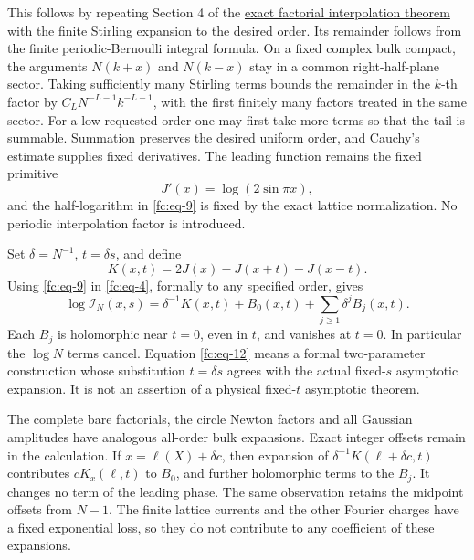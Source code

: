This follows by repeating Section 4 of the \href{https://sashakolpakov.github.io/murakamis_dream/notes/exact_factorial_interpolation_and_complex_contours.html}{exact factorial interpolation theorem} with the finite Stirling expansion to the desired order. Its remainder follows from the finite periodic-Bernoulli integral formula. On a fixed complex bulk compact, the arguments \(N(k+x)\) and \(N(k-x)\) stay in a common right-half-plane sector. Taking sufficiently many Stirling terms bounds the remainder in the \(k\)-th factor by \(C_LN^{-L-1}k^{-L-1}\), with the first finitely many factors treated in the same sector. For a low requested order one may first take more terms so that the tail is summable. Summation preserves the desired uniform order, and Cauchy's estimate supplies fixed derivatives. The leading function remains the fixed primitive
\begin{equation}\label{fc:eq-10}
J'(x)=\log(2\sin\pi x),
\end{equation}
 and the half-logarithm in \eqref{fc:eq-9} is fixed by the exact lattice normalization. No periodic interpolation factor is introduced.

Set \(\delta=N^{-1}\), \(t=\delta s\), and define
\begin{equation}\label{fc:eq-11}
K(x,t)=2J(x)-J(x+t)-J(x-t).
\end{equation}
 Using \eqref{fc:eq-9} in \eqref{fc:eq-4}, formally to any specified order, gives
\begin{equation}\label{fc:eq-12}
\log\mathcal I_N(x,s)=
  \delta^{-1}K(x,t)+B_0(x,t)
                  +\sum_{j\ge1}\delta^j B_j(x,t).
\end{equation}
 Each \(B_j\) is holomorphic near \(t=0\), even in \(t\), and vanishes at \(t=0\). In particular the \(\log N\) terms cancel. Equation \eqref{fc:eq-12} means a formal two-parameter construction whose substitution \(t=\delta s\) agrees with the actual fixed-\(s\) asymptotic expansion. It is not an assertion of a physical fixed-\(t\) asymptotic theorem.

The complete bare factorials, the circle Newton factors and all Gaussian amplitudes have analogous all-order bulk expansions. Exact integer offsets remain in the calculation. If \(x=\ell(X)+\delta c\), then expansion of \(\delta^{-1}K(\ell+\delta c,t)\) contributes \(cK_x(\ell,t)\) to \(B_0\), and further holomorphic terms to the \(B_j\). It changes no term of the leading phase. The same observation retains the midpoint offsets from \(N-1\). The finite lattice currents and the other Fourier charges have a fixed exponential loss, so they do not contribute to any coefficient of these expansions.

